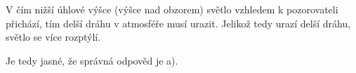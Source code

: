 \documentclass{../../../../style/mkimain}
\begin{document}
\noindent{}
\proborigin{}
\klein
V čím nižší úhlové výšce (výšce nad obzorem) světlo vzhledem k pozorovateli přichází, tím delší dráhu v atmosféře musí urazit.
Jelikož tedy urazí delší dráhu, světlo se více rozptýlí.

Je tedy jasné, že správná odpověd je a).
\end{document}
